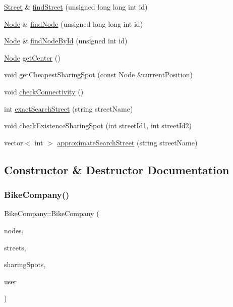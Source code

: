 \begin{DoxyCompactItemize}
\item 
\mbox{\hyperlink{class_street}{Street}} \& \mbox{\hyperlink{class_bike_company_a17955d80bd12b199559b72be003f601a}{find\+Street}} (unsigned long long int id)
\item 
\mbox{\hyperlink{class_node}{Node}} \& \mbox{\hyperlink{class_bike_company_ac3a38462c549de8c3c58c83c5e6f6696}{find\+Node}} (unsigned long long int id)
\item 
\mbox{\hyperlink{class_node}{Node}} \& \mbox{\hyperlink{class_bike_company_a7adfcf36f3e55f8c3498c4b304a3d4dc}{find\+Node\+By\+Id}} (unsigned int id)
\item 
\mbox{\hyperlink{class_node}{Node}} \mbox{\hyperlink{class_bike_company_aa14daa601b5b33e0f4bd3c78a1ff92b8}{get\+Center}} ()
\item 
void \mbox{\hyperlink{class_bike_company_a6cfdaa4ec2d86097301e0aa6f00fff7e}{get\+Cheapest\+Sharing\+Spot}} (const \mbox{\hyperlink{class_node}{Node}} \&current\+Position)
\item 
void \mbox{\hyperlink{class_bike_company_a5619c7888aed213bee9acf09f80fbad8}{check\+Connectivity}} ()
\item 
int \mbox{\hyperlink{class_bike_company_a7c844e84c41eff544d58c6b964dcacf7}{exact\+Search\+Street}} (string street\+Name)
\item 
void \mbox{\hyperlink{class_bike_company_a626158626f8a845c8002731d74231a42}{check\+Existence\+Sharing\+Spot}} (int street\+Id1, int street\+Id2)
\item 
vector$<$ int $>$ \mbox{\hyperlink{class_bike_company_acfc5f830f69bfb5f9db3f41391a1038c}{approximate\+Search\+Street}} (string street\+Name)
\end{DoxyCompactItemize}


\subsection{Constructor \& Destructor Documentation}
\mbox{\label{class_bike_company_ab435a4495b3ae8602162a51ebf50a3f4}} 
\subsubsection{\texorpdfstring{Bike\+Company()}{BikeCompany()}}
{\footnotesize\ttfamily Bike\+Company\+::\+Bike\+Company (\begin{DoxyParamCaption}\item[{const vector$<$ \mbox{\hyperlink{class_node}{Node}} $>$ \&}]{nodes,  }\item[{const vector$<$ \mbox{\hyperlink{class_street}{Street}} $>$ \&}]{streets,  }\item[{const vector$<$ \mbox{\hyperlink{class_sharing_spot}{Sharing\+Spot}} $>$ \&}]{sharing\+Spots,  }\item[{const \mbox{\hyperlink{class_user}{User}} \&}]{user }\end{DoxyParamCaption})}

